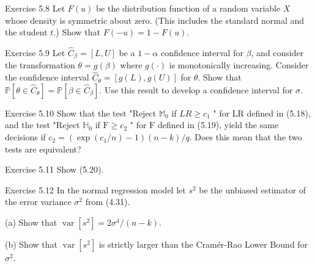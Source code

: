 \documentclass[10pt]{article}
\begin{document}
Exercise 5.8 Let $F(u)$ be the distribution function of a random variable $X$ whose density is symmetric about zero. (This includes the standard normal and the student $t$.) Show that $F(-u)=1-F(u)$.

Exercise 5.9 Let $\widehat{C}_{\beta}=[L, U]$ be a $1-\alpha$ confidence interval for $\beta$, and consider the transformation $\theta=g(\beta)$ where $g(\cdot)$ is monotonically increasing. Consider the confidence interval $\widehat{C}_{\theta}=[g(L), g(U)]$ for $\theta$. Show that $\mathbb{P}\left[\theta \in \widehat{C}_{\theta}\right]=\mathbb{P}\left[\beta \in \widehat{C}_{\beta}\right]$. Use this result to develop a confidence interval for $\sigma$.

Exercise 5.10 Show that the test "Reject $\mathbb{M}_{0}$ if $L R \geq c_{1}$ " for LR defined in (5.18), and the test "Reject $\mathbb{H}_{0}$ if $\mathrm{F} \geq c_{2}$ " for $\mathrm{F}$ defined in (5.19), yield the same decisions if $c_{2}=\left(\exp \left(c_{1} / n\right)-1\right)(n-k) / q$. Does this mean that the two tests are equivalent?

Exercise 5.11 Show (5.20).

Exercise 5.12 In the normal regression model let $s^{2}$ be the unbiased estimator of the error variance $\sigma^{2}$ from (4.31).

(a) Show that $\operatorname{var}\left[s^{2}\right]=2 \sigma^{4} /(n-k)$.

(b) Show that $\operatorname{var}\left[s^{2}\right]$ is strictly larger than the Cramér-Rao Lower Bound for $\sigma^{2}$.
\end{document}
